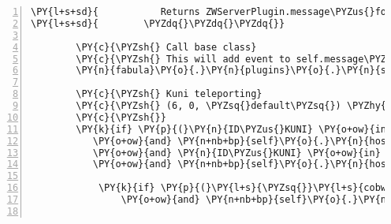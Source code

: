 \begin{Verbatim}[commandchars=\\\{\},numbers=left,firstnumber=1,stepnumber=1]
\PY{l+s+sd}{           Returns ZWServerPlugin.message\PYZus{}for\PYZus{}host.}
\PY{l+s+sd}{        \PYZdq{}\PYZdq{}\PYZdq{}}

        \PY{c}{\PYZsh{} Call base class}
        \PY{c}{\PYZsh{} This will add event to self.message\PYZus{}for\PYZus{}host}
        \PY{n}{fabula}\PY{o}{.}\PY{n}{plugins}\PY{o}{.}\PY{n}{serverside}\PY{o}{.}\PY{n}{DefaultGame}\PY{o}{.}\PY{n}{process\PYZus{}message}\PY{p}{(}\PY{n+nb+bp}{self}\PY{p}{,} \PY{n}{message}\PY{p}{)}

        \PY{c}{\PYZsh{} Kuni teleporting}
        \PY{c}{\PYZsh{} (6, 0, \PYZsq{}default\PYZsq{}) \PYZhy{}\PYZgt{} Teleports Kuni to room\PYZus{}kuni}
        \PY{c}{\PYZsh{}}
        \PY{k}{if} \PY{p}{(}\PY{n}{ID\PYZus{}KUNI} \PY{o+ow}{in} \PY{n+nb+bp}{self}\PY{o}{.}\PY{n}{host}\PY{o}{.}\PY{n}{room\PYZus{}by\PYZus{}client}\PY{o}{.}\PY{n}{keys}\PY{p}{(}\PY{p}{)}
           \PY{o+ow}{and} \PY{n+nb+bp}{self}\PY{o}{.}\PY{n}{host}\PY{o}{.}\PY{n}{room\PYZus{}by\PYZus{}client}\PY{p}{[}\PY{n}{ID\PYZus{}KUNI}\PY{p}{]}\PY{o}{.}\PY{n}{identifier} \PY{o}{==} \PY{l+s}{\PYZdq{}}\PY{l+s}{default}\PY{l+s}{\PYZdq{}}
           \PY{o+ow}{and} \PY{n}{ID\PYZus{}KUNI} \PY{o+ow}{in} \PY{n+nb+bp}{self}\PY{o}{.}\PY{n}{host}\PY{o}{.}\PY{n}{room\PYZus{}by\PYZus{}client}\PY{p}{[}\PY{n}{ID\PYZus{}KUNI}\PY{p}{]}\PY{o}{.}\PY{n}{entity\PYZus{}locations}\PY{o}{.}\PY{n}{keys}\PY{p}{(}\PY{p}{)}
           \PY{o+ow}{and} \PY{n+nb+bp}{self}\PY{o}{.}\PY{n}{host}\PY{o}{.}\PY{n}{room\PYZus{}by\PYZus{}client}\PY{p}{[}\PY{n}{ID\PYZus{}KUNI}\PY{p}{]}\PY{o}{.}\PY{n}{entity\PYZus{}locations}\PY{p}{[}\PY{n}{ID\PYZus{}KUNI}\PY{p}{]} \PY{o}{==} \PY{p}{(}\PY{l+m+mi}{6}\PY{p}{,} \PY{l+m+mi}{0}\PY{p}{)}\PY{p}{)}\PY{p}{:}

            \PY{k}{if} \PY{p}{(}\PY{l+s}{\PYZsq{}}\PY{l+s}{cobweb}\PY{l+s}{\PYZsq{}} \PY{o+ow}{in} \PY{n+nb+bp}{self}\PY{o}{.}\PY{n}{host}\PY{o}{.}\PY{n}{rack}\PY{o}{.}\PY{n}{owner\PYZus{}dict}\PY{o}{.}\PY{n}{keys}\PY{p}{(}\PY{p}{)}
                \PY{o+ow}{and} \PY{n+nb+bp}{self}\PY{o}{.}\PY{n}{host}\PY{o}{.}\PY{n}{rack}\PY{o}{.}\PY{n}{owner\PYZus{}dict}\PY{p}{[}\PY{l+s}{\PYZsq{}}\PY{l+s}{cobweb}\PY{l+s}{\PYZsq{}}\PY{p}{]} \PY{o}{==} \PY{n}{ID\PYZus{}KUNI}\PY{p}{)}\PY{p}{:}


\end{Verbatim}
